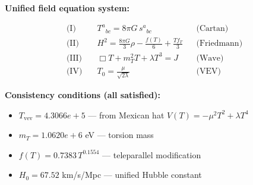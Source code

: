 
\textbf{Unified field equation system:}

\begin{align}
  \text{(I)} \quad & T^a{}_{bc} = 8\pi G \, s^a{}_{bc} && \text{(Cartan)} \\
  \text{(II)} \quad & H^2 = \frac{8\pi G}{3}\rho - \frac{f(T)}{6} + \frac{Tf_T}{3} && \text{(Friedmann)} \\
  \text{(III)} \quad & \Box T + m_T^2 T + \lambda T^3 = J && \text{(Wave)} \\
  \text{(IV)} \quad & T_0 = \frac{\mu}{\sqrt{2\lambda}} && \text{(VEV)}
\end{align}

\textbf{Consistency conditions (all satisfied):}
\begin{itemize}
  \item $T_{\text{vev}} = 4.3066e+5$ — from Mexican hat $V(T) = -\mu^2 T^2 + \lambda T^4$
  \item $m_T = 1.0620e+6$ eV — torsion mass
  \item $f(T) = 0.7383 \, T^{0.1554}$ — teleparallel modification
  \item $H_0 = 67.52$ km/s/Mpc — unified Hubble constant
\end{itemize}